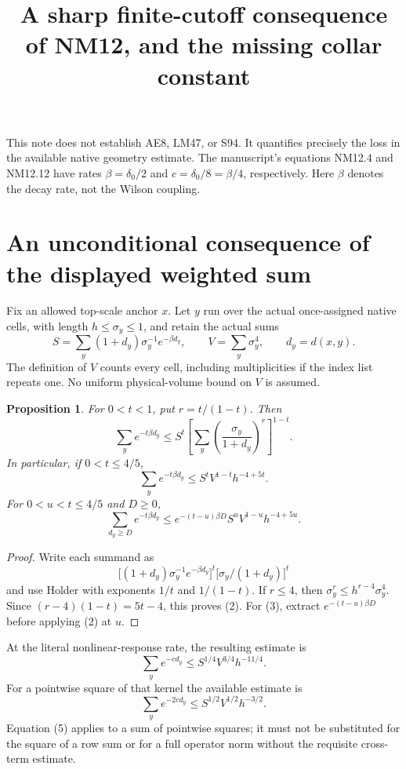 \documentclass{article}
\title{A sharp finite-cutoff consequence of NM12, and the missing collar constant}\author{}\date{}
\newtheorem{proposition}{Proposition}
\begin{document}
\maketitle
This note does not establish AE8, LM47, or S94. It quantifies precisely the loss in the available native geometry estimate. The manuscript's equations NM12.4 and NM12.12 have rates $\beta=\delta_0/2$ and $c=\delta_0/8=\beta/4$, respectively. Here $\beta$ denotes the decay rate, not the Wilson coupling.

\section{An unconditional consequence of the displayed weighted sum}
Fix an allowed top-scale anchor $x$. Let $y$ run over the actual once-assigned native cells, with length $h\leq\sigma_y\leq1$, and retain the actual sums
\[
 S=\sum_y(1+d_y)\sigma_y^{-1}e^{-\beta d_y},\qquad
 V=\sum_y\sigma_y^4,\qquad d_y=d(x,y).
\]
The definition of $V$ counts every cell, including multiplicities if the index list repeats one. No uniform physical-volume bound on $V$ is assumed.

\begin{proposition}
For $0<t<1$, put $r=t/(1-t)$. Then
\[
 \sum_y e^{-t\beta d_y}
 \leq S^t\left[\sum_y\left(\frac{\sigma_y}{1+d_y}\right)^r\right]^{1-t}.
 \tag{1}
\]
In particular, if $0<t\leq4/5$,
\[
 \sum_y e^{-t\beta d_y}\leq S^tV^{1-t}h^{-4+5t}.
 \tag{2}
\]
For $0<u<t\leq4/5$ and $D\geq0$,
\[
 \sum_{d_y\geq D}e^{-t\beta d_y}
 \leq e^{-(t-u)\beta D}S^uV^{1-u}h^{-4+5u}.
 \tag{3}
\]
\end{proposition}
\begin{proof}
Write each summand as
\[
 \big[(1+d_y)\sigma_y^{-1}e^{-\beta d_y}\big]^t
 \big[\sigma_y/(1+d_y)\big]^t
\]
and use Holder with exponents $1/t$ and $1/(1-t)$. If $r\leq4$, then $\sigma_y^r\leq h^{r-4}\sigma_y^4$. Since $(r-4)(1-t)=5t-4$, this proves (2). For (3), extract $e^{-(t-u)\beta D}$ before applying (2) at $u$.
\end{proof}

At the literal nonlinear-response rate, the resulting estimate is
\[
 \sum_y e^{-c d_y}\leq S^{1/4}V^{3/4}h^{-11/4}.
 \tag{4}
\]
For a pointwise square of that kernel the available estimate is
\[
 \sum_y e^{-2c d_y}\leq S^{1/2}V^{1/2}h^{-3/2}.
 \tag{5}
\]
Equation (5) applies to a sum of pointwise squares; it must not be substituted for the square of a row sum or for a full operator norm without the requisite cross-term estimate.
\end{document}
